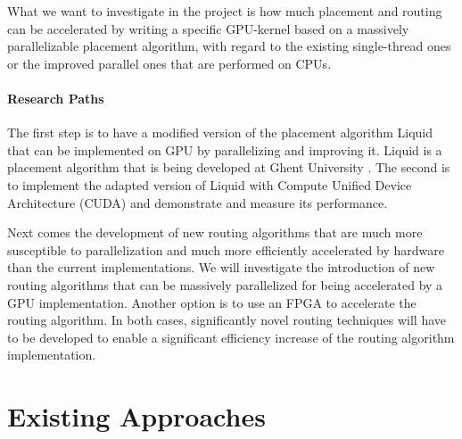 \documentclass[a4paper,oneside,12pt]{article}
\begin{document}
What we want to investigate in the project is how much placement and routing can be accelerated by writing a specific GPU-kernel based on a massively parallelizable placement algorithm, with regard to the existing single-thread ones or the improved parallel ones that are performed on CPUs.
\paragraph{Research Paths}
The first step is to have a modified version of the placement algorithm {\sc Liquid} that can be implemented on GPU by parallelizing and improving it. {\sc Liquid} is a placement algorithm that is being developed at Ghent University \cite{liquid}.
The second is to implement the adapted version of {\sc Liquid} with Compute Unified Device Architecture (CUDA) \cite{nickolls2008scalable} and demonstrate and measure its performance.

Next comes the development of new routing algorithms that are much more susceptible to parallelization and much more efficiently accelerated by hardware than the current implementations. %
We will investigate the introduction of new routing algorithms that can be massively parallelized for being accelerated by a GPU implementation. Another option is to use an FPGA to accelerate the routing algorithm. In both cases, significantly novel routing techniques will have to be developed to enable a significant efficiency increase of the routing algorithm implementation.




\section{Existing Approaches}
\label{existingapproach}
\end{document}
